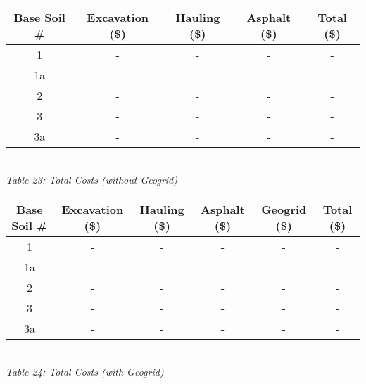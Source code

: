 \documentclass{article}
\begin{document}
\begin{center}
    \vspace{7mm}
    \begin{tabular}{|c|cccc|}
        \hline
        \textbf{Base Soil \#} & \textbf{Excavation (\$)} & \textbf{Hauling (\$)} & \textbf{Asphalt (\$)} & \textbf{Total (\$)} \\\hline
        1              & -                             & -                      & -   &-         \\
        1a             & -                            & -                       & -   &-        \\
        2              & -                            & -                       & -   &-        \\
        3              & -                            & -                       & -   &-        \\
        3a             & -                            & -                      & -    &-        \\\hline
    \end{tabular}
    \vspace{3mm}
    \emph{\\Table 23: Total Costs (without Geogrid)\\}
    \newpage
    \begin{tabular}{|c|ccccc|}
        \hline
        \textbf{Base Soil \#} & \textbf{Excavation (\$)} & \textbf{Hauling (\$)} & \textbf{Asphalt (\$)} & \textbf{Geogrid (\$)} & \textbf{Total (\$)} \\\hline
        1              & -                             & -                      & -   &-      &-         \\
        1a             & -                            & -                       & -   &-      &-  \\
        2              & -                            & -                       & -   &-      &-  \\
        3              & -                            & -                       & -   &-      &-  \\
        3a             & -                            & -                      & -    &-     &-  \\\hline
    \end{tabular}
    \vspace{3mm}
    \emph{\\Table 24: Total Costs (with Geogrid)\\}
\end{center}
\newpage
\end{document}
